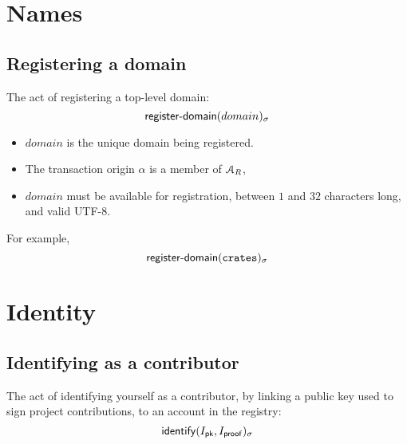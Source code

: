 \section{Names}

\subsection{Registering a domain}
The act of registering a top-level domain:
\[
    \operatorname{\mathsf{register-domain}}\lparen domain\rparen_\sigma
\]
\begin{itemize}
    \item $domain$ is the unique domain being registered.
\end{itemize}
\validation
\begin{itemize}
    \item The transaction origin $\alpha$ is a member of $\mathcal{A}_R$,
    \item $domain$ must be available for registration, between $1$ and $32$
        characters long, and valid \textsf{UTF-8}.
\end{itemize}
For example,
\[
    \operatorname{\mathsf{register-domain}}\lparen\mathtt{crates}\rparen_\sigma
\]

\section{Identity}

\subsection{Identifying as a contributor}
The act of identifying yourself as a contributor, by linking a public key used
to sign project contributions, to an account in the registry:
\[
    \operatorname{\mathsf{identify}}\lparen I_{\mathsf{pk}}, I_{\mathsf{proof}}\rparen_\sigma
\]


